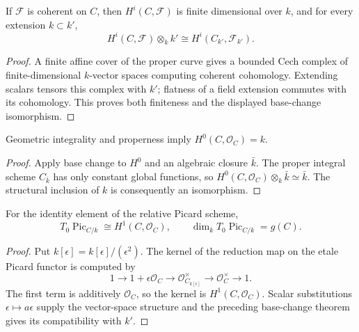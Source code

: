 \begin{theorem}
  \label{pa-thm-cohomology}
  \cite{stacks-project}
  If \(\mathcal F\) is coherent on \(C\), then \(H^i(C,\mathcal F)\) is finite
  dimensional over \(k\), and for every extension \(k\subset k'\),
  \[
    H^i(C,\mathcal F)\otimes_k k'\cong
    H^i(C_{k'},\mathcal F_{k'}).
  \]
\end{theorem}

\begin{proof}
  A finite affine cover of the proper curve gives a bounded Cech complex of
  finite-dimensional \(k\)-vector spaces computing coherent cohomology.
  Extending scalars tensors this complex with \(k'\); flatness of a field
  extension commutes with its cohomology.  This proves both finiteness and the
  displayed base-change isomorphism.
\end{proof}

\begin{proposition}
  \label{pa-prop-global-functions}
  \cite{hartshorne-ag,stacks-project}
  Geometric integrality and properness imply \(H^0(C,\mathcal O_C)=k\).
\end{proposition}

\begin{proof}
  Apply base change to \(H^0\) and an algebraic closure \(\bar k\).  The
  proper integral scheme \(C_{\bar k}\) has only constant global functions,
  so
  \(H^0(C,\mathcal O_C)\otimes_k\bar k\simeq\bar k\).  The structural
  inclusion of \(k\) is consequently an isomorphism.
\end{proof}

\begin{proposition}
  \label{pa-prop-picard-tangent}
  \cite[Thm.~5.11]{kleiman-picard}
  For the identity element of the relative Picard scheme,
  \[
    T_0\operatorname{Pic}_{C/k}\cong H^1(C,\mathcal O_C),
    \qquad \dim_kT_0\operatorname{Pic}_{C/k}=g(C).
  \]
\end{proposition}

\begin{proof}
  Put \(k[\epsilon]=k[\epsilon]/(\epsilon^2)\).  The kernel of the reduction
  map on the etale Picard functor is computed by
  \[
    1\longrightarrow1+\epsilon\mathcal O_C
    \longrightarrow\mathcal O_{C_{k[\epsilon]}}^\times
    \longrightarrow\mathcal O_C^\times\longrightarrow1.
  \]
  The first term is additively \(\mathcal O_C\), so the kernel is
  \(H^1(C,\mathcal O_C)\).  Scalar substitutions
  \(\epsilon\mapsto a\epsilon\) supply the vector-space structure and the
  preceding base-change theorem gives its compatibility with \(k'\).
\end{proof}
